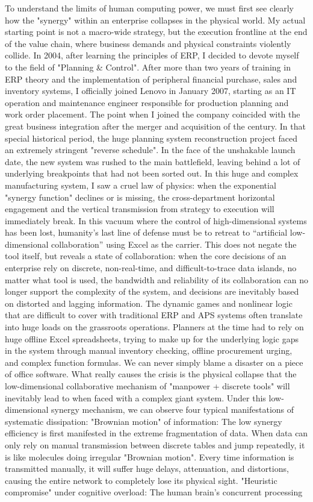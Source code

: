 \documentclass[11pt,a4paper]{article}
\begin{document}
To understand the limits of human computing power, we must first see clearly how the "synergy" within an enterprise collapses in the physical world. My actual starting point is not a macro-wide strategy, but the execution frontline at the end of the value chain, where business demands and physical constraints violently collide. In 2004, after learning the principles of ERP, I decided to devote myself to the field of "Planning \& Control". After more than two years of training in ERP theory and the implementation of peripheral financial purchase, sales and inventory systems, I officially joined Lenovo in January 2007, starting as an IT operation and maintenance engineer responsible for production planning and work order placement. The point when I joined the company coincided with the great business integration after the merger and acquisition of the century. In that special historical period, the huge planning system reconstruction project faced an extremely stringent "reverse schedule". In the face of the unshakable launch date, the new system was rushed to the main battlefield, leaving behind a lot of underlying breakpoints that had not been sorted out. In this huge and complex manufacturing system, I saw a cruel law of physics: when the exponential "synergy function" declines or is missing, the cross-department horizontal engagement and the vertical transmission from strategy to execution will immediately break. In this vacuum where the control of high-dimensional systems has been lost, humanity’s last line of defense must be to retreat to “artificial low-dimensional collaboration” using Excel as the carrier. This does not negate the tool itself, but reveals a state of collaboration: when the core decisions of an enterprise rely on discrete, non-real-time, and difficult-to-trace data islands, no matter what tool is used, the bandwidth and reliability of its collaboration can no longer support the complexity of the system, and decisions are inevitably based on distorted and lagging information. The dynamic games and nonlinear logic that are difficult to cover with traditional ERP and APS systems often translate into huge loads on the grassroots operations. Planners at the time had to rely on huge offline Excel spreadsheets, trying to make up for the underlying logic gaps in the system through manual inventory checking, offline procurement urging, and complex function formulas. We can never simply blame a disaster on a piece of office software. What really causes the crisis is the physical collapse that the low-dimensional collaborative mechanism of "manpower + discrete tools" will inevitably lead to when faced with a complex giant system. Under this low-dimensional synergy mechanism, we can observe four typical manifestations of systematic dissipation: "Brownian motion" of information: The low synergy efficiency is first manifested in the extreme fragmentation of data. When data can only rely on manual transmission between discrete tables and jump repeatedly, it is like molecules doing irregular "Brownian motion". Every time information is transmitted manually, it will suffer huge delays, attenuation, and distortions, causing the entire network to completely lose its physical sight. "Heuristic compromise" under cognitive overload: The human brain's concurrent processing 
\end{document}
